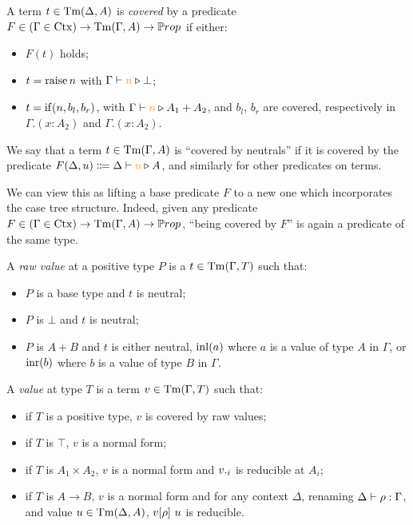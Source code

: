 \documentclass[a4paper,UKenglish,cleveref, autoref, thm-restate]{lipics-v2021}
\begin{document}
\begin{definition}
  A term \(t \in \Tm(\Delta,A)\) is \emph{covered} by a predicate
    \(F \in (\Gamma \in \Ctx) \to \Tm(\Gamma,A) \to \Prop\)
  if either:
  \begin{itemize}
    \item \(F(t)\) holds;
    \item \(t = \rai n\) with \(\infer{\Gamma}{n}{\bot}\);
    \item \(t = \ite{n}{b_l}{b_r}\), with \(\infer{\Gamma}{n}{A_1 + A_2}\),
      and \(b_l\), \(b_r\) are covered, respectively in \(\Gamma.(x:A_2)\) and
      \(\Gamma.(x:A_2)\).
  \end{itemize}
  We say that a term \(t \in \Tm(\Gamma,A)\) is ``covered by neutrals'' if it is covered
  by the predicate \(F(\Delta,u) \Coloneqq \infer{\Delta}{u}{A}\), and similarly
  for other predicates on terms.
\end{definition}

We can view this as lifting a base predicate \(F\) to a
new one which incorporates the case tree structure.
Indeed, given any predicate \(F \in (\Gamma \in \Ctx) \to \Tm(\Gamma,A) \to \Prop\),
``being covered by \(F\)'' is again a predicate of the same type.


\begin{definition}
  A \emph{raw value} at a positive type \(P\) is a \(t \in \Tm(\Gamma,T)\)
  such that:
  \begin{itemize}
    \item \(P\) is a base type and \(t\) is neutral;
    \item \(P\) is \(\bot\) and \(t\) is neutral;
    \item \(P\) is \(A + B\) and \(t\) is either neutral, \(\inl(a)\) where
      \(a\) is a value of type \(A\) in \(\Gamma\), or \(\inr(b)\) where \(b\) is
      a value of type \(B\) in \(\Gamma\).
  \end{itemize}

  A \emph{value} at type \(T\) is a term \(v \in \Tm(\Gamma,T)\) such that:
  \begin{itemize}
    \item if \(T\) is a positive type, \(v\) is covered by raw values;
    \item if \(T\) is \(\top\), \(v\) is a normal form;
    \item if \(T\) is \(A_1 \times A_2\), \(v\) is a normal form and \(\proj{i}{v}\)
      is reducible at \(A_i\);
    \item if \(T\) is \(A \to B\), \(v\) is a normal form and for any
      context \(\Delta\), renaming \(\typing{\Delta}{\rho}[\Gamma]\),
      and value \(u \in \Tm(\Delta,A)\), \(\subs{v}{\rho}~u\) is reducible.
  \end{itemize}
\end{definition}
  
\end{document}
